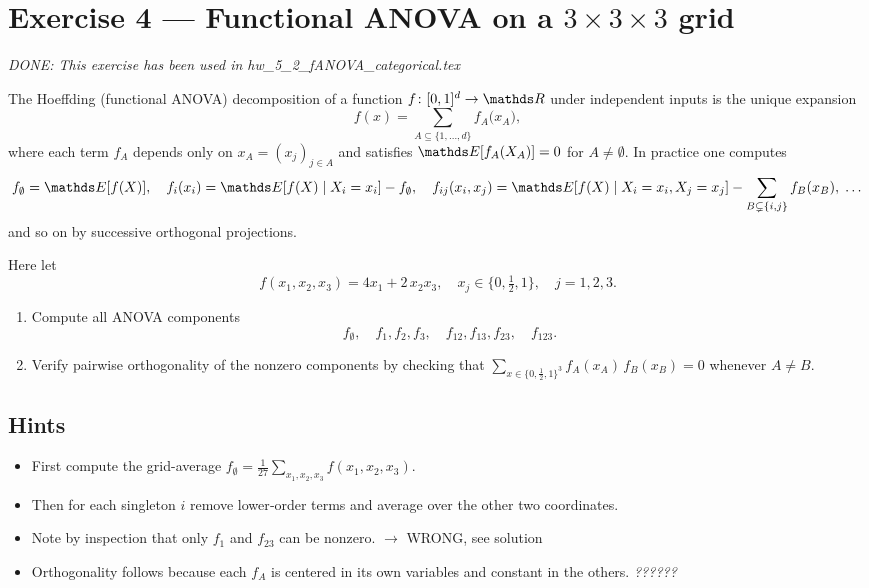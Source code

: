 \documentclass[a4paper]{article}
\begin{document}
\section*{Exercise 4 — Functional ANOVA on a $3\times3\times3$ grid}
\label{ex:FA_grid_improved}

\textit{DONE: This exercise has been used in hw\_5\_2\_fANOVA\_categorical.tex}

The Hoeffding (functional ANOVA) decomposition of a function 
$f\colon[0,1]^d\to\R$ under independent inputs is the unique expansion
\[
f(x)
=\sum_{A\subseteq\{1,\dots,d\}} f_A\bigl(x_A\bigr),
\]
where each term $f_A$ depends only on $x_A=(x_j)_{j\in A}$ and satisfies
$\E[f_A(X_A)]=0$ for $A\neq\emptyset$.  In practice one computes
\[
f_\emptyset=\E[f(X)],\quad
f_i(x_i)=\E[f(X)\mid X_i=x_i]-f_\emptyset,\quad
f_{ij}(x_i,x_j)=\E[f(X)\mid X_i=x_i,X_j=x_j]
-\sum_{B\subsetneq\{i,j\}}f_B(x_B),\;\dots
\]
and so on by successive orthogonal projections.

Here let
\[
f(x_1,x_2,x_3)=4x_1 + 2\,x_2x_3,
\quad
x_j\in\{0,\tfrac12,1\},\quad j=1,2,3.
\]
\begin{enumerate}%
  \item Compute all ANOVA components
        \[
          f_\emptyset,\quad
          f_{1},f_{2},f_{3},\quad
          f_{12},f_{13},f_{23},\quad
          f_{123}.
        \]
  \item Verify pairwise orthogonality of the nonzero components
        by checking that
        \(\sum_{x\in\{0,\frac12,1\}^3} f_A(x_A)\,f_B(x_B)=0\)
        whenever $A\neq B$.
\end{enumerate}

\subsection*{Hints}
\begin{itemize}
  \item First compute the grid-average
        \(f_\emptyset=\tfrac1{27}\sum_{x_1,x_2,x_3}f(x_1,x_2,x_3).\)
  \item Then for each singleton $i$ remove lower‐order terms and average
        over the other two coordinates.
  \item Note by inspection that only $f_1$ and $f_{23}$ can be nonzero. $\rightarrow$ WRONG, see solution
  \item Orthogonality follows because each $f_A$ is centered in its own
        variables and constant in the others.  \textit{??????}
\end{itemize}
\end{document}
